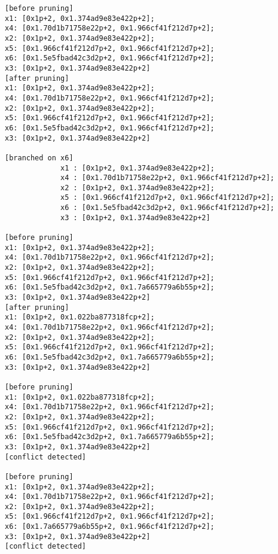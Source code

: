 \begin{lstlisting}
[before pruning]
x1: [0x1p+2, 0x1.374ad9e83e422p+2];
x4: [0x1.70d1b71758e22p+2, 0x1.966cf41f212d7p+2];
x2: [0x1p+2, 0x1.374ad9e83e422p+2];
x5: [0x1.966cf41f212d7p+2, 0x1.966cf41f212d7p+2];
x6: [0x1.5e5fbad42c3d2p+2, 0x1.966cf41f212d7p+2];
x3: [0x1p+2, 0x1.374ad9e83e422p+2]
[after pruning]
x1: [0x1p+2, 0x1.374ad9e83e422p+2];
x4: [0x1.70d1b71758e22p+2, 0x1.966cf41f212d7p+2];
x2: [0x1p+2, 0x1.374ad9e83e422p+2];
x5: [0x1.966cf41f212d7p+2, 0x1.966cf41f212d7p+2];
x6: [0x1.5e5fbad42c3d2p+2, 0x1.966cf41f212d7p+2];
x3: [0x1p+2, 0x1.374ad9e83e422p+2]

[branched on x6]
             x1 : [0x1p+2, 0x1.374ad9e83e422p+2];
             x4 : [0x1.70d1b71758e22p+2, 0x1.966cf41f212d7p+2];
             x2 : [0x1p+2, 0x1.374ad9e83e422p+2];
             x5 : [0x1.966cf41f212d7p+2, 0x1.966cf41f212d7p+2];
             x6 : [0x1.5e5fbad42c3d2p+2, 0x1.966cf41f212d7p+2];
             x3 : [0x1p+2, 0x1.374ad9e83e422p+2]

[before pruning]
x1: [0x1p+2, 0x1.374ad9e83e422p+2];
x4: [0x1.70d1b71758e22p+2, 0x1.966cf41f212d7p+2];
x2: [0x1p+2, 0x1.374ad9e83e422p+2];
x5: [0x1.966cf41f212d7p+2, 0x1.966cf41f212d7p+2];
x6: [0x1.5e5fbad42c3d2p+2, 0x1.7a665779a6b55p+2];
x3: [0x1p+2, 0x1.374ad9e83e422p+2]
[after pruning]
x1: [0x1p+2, 0x1.022ba877318fcp+2];
x4: [0x1.70d1b71758e22p+2, 0x1.966cf41f212d7p+2];
x2: [0x1p+2, 0x1.374ad9e83e422p+2];
x5: [0x1.966cf41f212d7p+2, 0x1.966cf41f212d7p+2];
x6: [0x1.5e5fbad42c3d2p+2, 0x1.7a665779a6b55p+2];
x3: [0x1p+2, 0x1.374ad9e83e422p+2]

[before pruning]
x1: [0x1p+2, 0x1.022ba877318fcp+2];
x4: [0x1.70d1b71758e22p+2, 0x1.966cf41f212d7p+2];
x2: [0x1p+2, 0x1.374ad9e83e422p+2];
x5: [0x1.966cf41f212d7p+2, 0x1.966cf41f212d7p+2];
x6: [0x1.5e5fbad42c3d2p+2, 0x1.7a665779a6b55p+2];
x3: [0x1p+2, 0x1.374ad9e83e422p+2]
[conflict detected]

[before pruning]
x1: [0x1p+2, 0x1.374ad9e83e422p+2];
x4: [0x1.70d1b71758e22p+2, 0x1.966cf41f212d7p+2];
x2: [0x1p+2, 0x1.374ad9e83e422p+2];
x5: [0x1.966cf41f212d7p+2, 0x1.966cf41f212d7p+2];
x6: [0x1.7a665779a6b55p+2, 0x1.966cf41f212d7p+2];
x3: [0x1p+2, 0x1.374ad9e83e422p+2]
[conflict detected]
\end{lstlisting}

